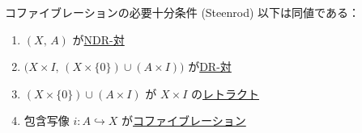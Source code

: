 \documentclass[algtopo_main]{subfiles}
\begin{document}
\begin{mytheo}[label=thm:cofib-basic-Steenrod]{コファイブレーションの必要十分条件 (Steenrod)}
    以下は同値である：
    \begin{enumerate}
        \item $(X,\, A)$ が\hyperref[def:NDR]{NDR-対}
        \item $\bigl(X \times I,\, (X \times \{0\}) \cup (A \times I)\bigr)$ が\hyperref[def:NDR]{DR-対}
        \item $(X \times \{0\}) \cup (A \times I)$ が $X \times I$ の\hyperref[def:retract]{レトラクト}
        \item 包含写像 $i \colon A \hookrightarrow X$ が\hyperref[def:cofibration]{コファイブレーション}
    \end{enumerate}
\end{mytheo}
\end{document}
